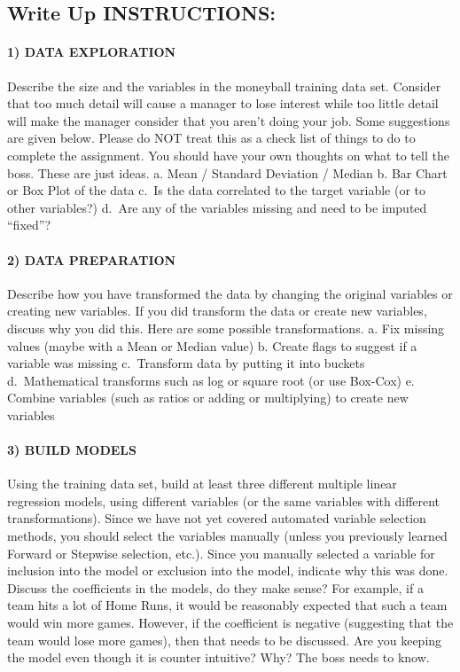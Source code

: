 \documentclass[
]{article}
\begin{document}
\subsection{Write Up INSTRUCTIONS:}\label{write-up-instructions}

\paragraph{1) DATA EXPLORATION}\label{data-exploration}

Describe the size and the variables in the moneyball training data set.
Consider that too much detail will cause a manager to lose interest
while too little detail will make the manager consider that you aren't
doing your job. Some suggestions are given below. Please do NOT treat
this as a check list of things to do to complete the assignment. You
should have your own thoughts on what to tell the boss. These are just
ideas. a. Mean / Standard Deviation / Median b. Bar Chart or Box Plot of
the data c.~Is the data correlated to the target variable (or to other
variables?) d.~Are any of the variables missing and need to be imputed
``fixed''?

\paragraph{2) DATA PREPARATION}\label{data-preparation}

Describe how you have transformed the data by changing the original
variables or creating new variables. If you did transform the data or
create new variables, discuss why you did this. Here are some possible
transformations. a. Fix missing values (maybe with a Mean or Median
value) b. Create flags to suggest if a variable was missing c.~Transform
data by putting it into buckets d.~Mathematical transforms such as log
or square root (or use Box-Cox) e. Combine variables (such as ratios or
adding or multiplying) to create new variables

\paragraph{3) BUILD MODELS}\label{build-models}

Using the training data set, build at least three different multiple
linear regression models, using different variables (or the same
variables with different transformations). Since we have not yet covered
automated variable selection methods, you should select the variables
manually (unless you previously learned Forward or Stepwise selection,
etc.). Since you manually selected a variable for inclusion into the
model or exclusion into the model, indicate why this was done. Discuss
the coefficients in the models, do they make sense? For example, if a
team hits a lot of Home Runs, it would be reasonably expected that such
a team would win more games. However, if the coefficient is negative
(suggesting that the team would lose more games), then that needs to be
discussed. Are you keeping the model even though it is counter
intuitive? Why? The boss needs to know.
\end{document}
